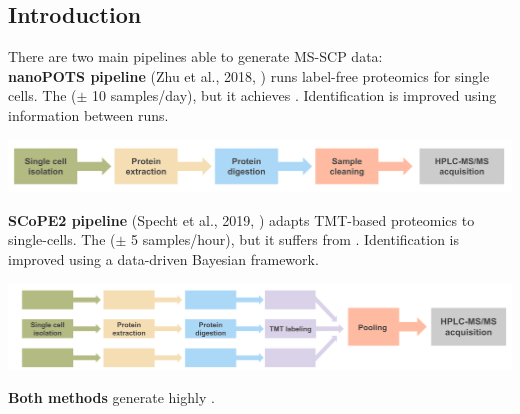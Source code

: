 \documentclass{article}
\begin{document}
\setlength{\columnsep}{0.5cm}
\begin{multicols}{2}

\noindent
\begin{minipage}[t]{\linewidth}
  \vspace{0.5cm}
  \section*{\huge Introduction}
  \large
  There are two main pipelines able to generate MS-SCP data: \\
  \textbf{\large nanoPOTS pipeline} (Zhu et al., 2018, \cite{Zhu2018-bf}) runs label-free proteomics for single cells. The \textbf{\color{BrickRed}{throughput is low}} ($\pm$ 10 samples/day), but it achieves \textbf{\color{OliveGreen}{accurate peptide quantification}}. Identification is improved using information between runs. 
  \vspace{-0.3cm}
  \begin{center}
    \includegraphics[width=0.87\linewidth]{figs/nanopots.png} \\
  \end{center}
  \vspace{-0.3cm}
  \textbf{\large SCoPE2 pipeline} (Specht et al., 2019, \cite{Specht2019-jm}) adapts TMT-based proteomics to single-cells. The \textbf{\color{OliveGreen}{throughput is higher}} ($\pm$ 5 samples/hour), but it suffers from \textbf{\color{BrickRed}{batch effects}}. Identification is improved using a data-driven Bayesian framework.
  \begin{center}
    \includegraphics[width=0.9\linewidth]{figs/scopems.png} \\
  \end{center}
  \vspace{-0.3cm}
  \textbf{\large Both methods} generate highly  \textbf{\color{BrickRed}{missing data}}.
    

\end{minipage}
\end{multicols}
\end{document}
